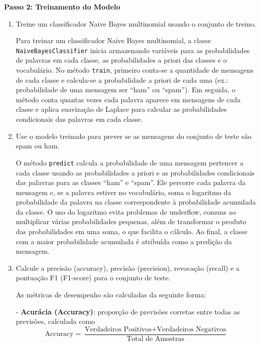 \textbf{Passo 2: Treinamento do Modelo}

\begin{enumerate}
    \item Treine um classificador Naive Bayes multinomial usando o conjunto de treino.
    \begin{tcolorbox}[title=Resposta:]
        Para treinar um classificador Naive Bayes multinomial, a classe \texttt{NaiveBayesClassifier} inicia armazenando variáveis para as probabilidades de palavras em cada classe, as probabilidades a priori das classes e o vocabulário. No método \texttt{train}, primeiro conta-se a quantidade de mensagens de cada classe e calcula-se a probabilidade a priori de cada uma (ex.: probabilidade de uma mensagem ser ``ham'' ou ``spam''). Em seguida, o método conta quantas vezes cada palavra aparece em mensagens de cada classe e aplica suavização de Laplace para calcular as probabilidades condicionais das palavras em cada classe.
        \end{tcolorbox}
    \item Use o modelo treinado para prever se as mensagens do conjunto de teste são spam ou ham.
    \begin{tcolorbox}[title=Resposta:]
        O método \texttt{predict} calcula a probabilidade de uma mensagem pertencer a cada classe usando as probabilidades a priori e as probabilidades condicionais das palavras para as classes ``ham'' e ``spam''. Ele percorre cada palavra da mensagem e, se a palavra estiver no vocabulário, soma o logaritmo da probabilidade da palavra na classe correspondente à probabilidade acumulada da classe. O uso do logaritmo evita problemas de underflow, comuns ao multiplicar várias probabilidades pequenas, além de transformar o produto das probabilidades em uma soma, o que facilita o cálculo. Ao final, a classe com a maior probabilidade acumulada é atribuída como a predição da mensagem.
        \end{tcolorbox}
        
    \newpage
    \item Calcule a precisão (accuracy), precisão (precision), revocação (recall) e a pontuação F1 (F1-score) para o conjunto de teste.
    \begin{tcolorbox}[title=Resposta:]
        As métricas de desempenho são calculadas da seguinte forma:
        
        - \textbf{Acurácia (Accuracy)}: proporção de previsões corretas entre todas as previsões, calculada como 
        \[
        \text{Accuracy} = \frac{\text{Verdadeiros Positivos} + \text{Verdadeiros Negativos}}{\text{Total de Amostras}}
        \]
        

\end{tcolorbox}
\end{enumerate}
